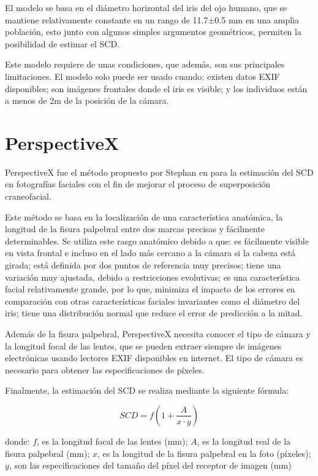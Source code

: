 El modelo se basa en el diámetro horizontal del iris del ojo humano, que se mantiene relativamente constante en un rango de 11.7±0.5 mm en una amplia población, esto junto con algunos simples argumentos geométricos, permiten la posibilidad de estimar el SCD.

Este modelo requiere de unas condiciones, que además, son sus principales limitaciones. El modelo solo puede ser usado cuando: existen datos EXIF disponibles; son imágenes frontales donde el iris es visible; y los individuos están a menos de 2m de la posición de la cámara.



\section{PerspectiveX}

PerspectiveX fue el método propuesto por Stephan en \cite{31} para la estimación del SCD en fotografías faciales con el fin de mejorar el proceso de superposición craneofacial.

Este método se basa en la localización de una característica anatómica, la longitud de la fisura palpebral entre dos marcas precisas y fácilmente determinables. Se utiliza este rasgo anatómico debido a que: es fácilmente visible en vista frontal e incluso en el lado más cercano a la cámara si la cabeza está girada; está definida por dos puntos de referencia muy precisos; tiene una variación muy ajustada, debido a restricciones evolutivas; es una característica facial relativamente grande, por lo que, minimiza el impacto de los errores en comparación con otras características faciales invariantes como el diámetro del iris; tiene una distribución normal que reduce el error de predicción a la mitad.

Además de la fisura palpebral, PerspectiveX necesita conocer el tipo de cámara y la longitud focal de las lentes, que se pueden extraer siempre de imágenes electrónicas usando lectores EXIF disponibles en internet. El tipo de cámara es necesario para obtener las especificaciones de píxeles.

Finalmente, la estimación del SCD se realiza mediante la siguiente fórmula:

\begin{equation}
	SCD = f (1+\frac{A}{x \cdot y})
\end{equation}

donde: $f$, es la longitud focal de las lentes (mm); $A$, es la longitud real de la fisura palpebral (mm); $x$, es la longitud de la fisura palpebral en la foto (píxeles); $y$, son las especificaciones del tamaño del píxel del receptor de imagen (mm)

